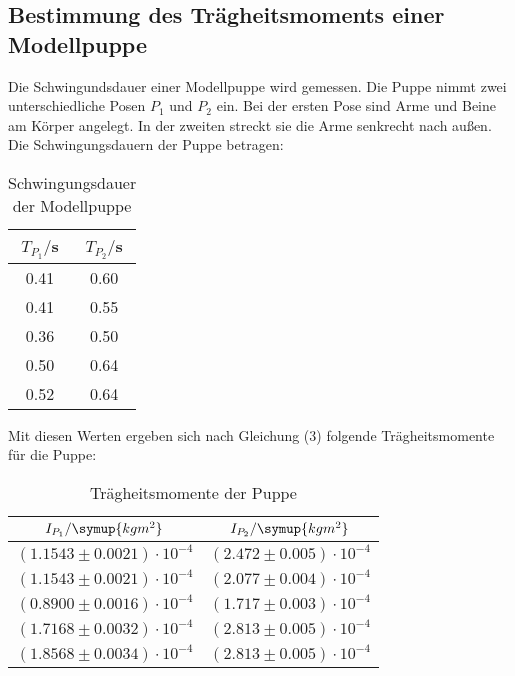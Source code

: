 \subsection{Bestimmung des Trägheitsmoments einer Modellpuppe}
Die Schwingundsdauer einer Modellpuppe wird gemessen. Die Puppe nimmt zwei unterschiedliche
Posen $P_1$ und $P_2$ ein. Bei der ersten Pose sind Arme und Beine am Körper angelegt. In der zweiten
streckt sie die Arme senkrecht nach außen. Die Schwingungsdauern der Puppe betragen:
\begin{table}
  \centering
  \caption{Schwingungsdauer der Modellpuppe}
  \label{tab:Schwingungsdauer der Modellpuppe}
  \begin{tabular}{c c}
    \toprule
    $T_{P_1}/$s & $T_{P_2}/$s \\
    \midrule
    0.41 & 0.60 \\
    0.41 & 0.55 \\
    0.36 & 0.50 \\
    0.50 & 0.64 \\
    0.52 & 0.64 \\
    \bottomrule
  \end{tabular}
\end{table}

Mit diesen Werten ergeben sich nach Gleichung (3) folgende Trägheitsmomente
für die Puppe:
\begin{table}[H]
  \centering
  \caption{Trägheitsmomente der Puppe}
  \label{tab:Trägheitsmomente der Puppe}
  \begin{tabular}{c c}
    \toprule
    $I_{P_1}/\symup{kgm^2}$ & $I_{P_2}/\symup{kgm^2}$ \\
    \midrule
    $(1.1543 \pm 0.0021)\cdot 10^{-4}$ & $(2.472 \pm 0.005)\cdot 10^{-4}$ \\
    $(1.1543 \pm 0.0021)\cdot 10^{-4}$ & $(2.077 \pm 0.004)\cdot 10^{-4}$ \\
    $(0.8900 \pm 0.0016)\cdot 10^{-4}$ & $(1.717 \pm 0.003)\cdot 10^{-4}$ \\
    $(1.7168 \pm 0.0032)\cdot 10^{-4}$ & $(2.813 \pm 0.005)\cdot 10^{-4}$ \\
    $(1.8568 \pm 0.0034)\cdot 10^{-4}$ & $(2.813 \pm 0.005)\cdot 10^{-4}$ \\
    \bottomrule
  \end{tabular}
\end{table}

